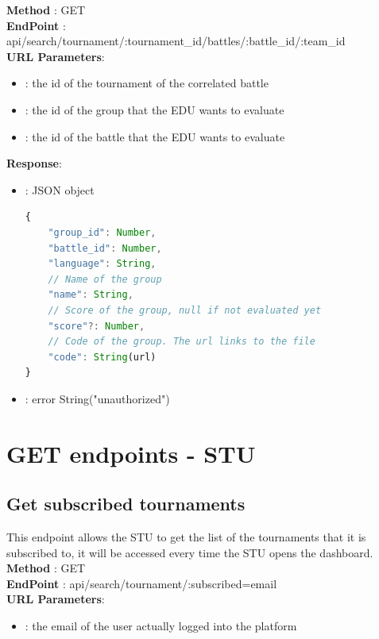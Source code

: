 \textbf{Method} : GET \\
\textbf{EndPoint} : api/search/tournament/:tournament\_id/battles/:battle\_id/:team\_id     \\
\textbf{URL Parameters}:
\begin{itemize}
    \item {} : the id of the tournament of the correlated battle
    \item {}: the id of the group that the EDU wants to evaluate
    \item {}: the id of the battle that the EDU wants to evaluate
\end{itemize}
\textbf{Response}:
\begin{itemize}
    \item {} : JSON object
          \begin{lstlisting}[language=JavaScript, label={lst:jscode}, basicstyle=\ttfamily]
{
    "group_id": Number,
    "battle_id": Number,
    "language": String,
    // Name of the group
    "name": String,
    // Score of the group, null if not evaluated yet
    "score"?: Number,
    // Code of the group. The url links to the file
    "code": String(url)
}
    \end{lstlisting}
    \item {} : error String("unauthorized")
\end{itemize}



\section*{GET endpoints - STU}

\subsection*{Get subscribed tournaments}
This endpoint allows the STU to get the list of the tournaments that it is subscribed to, it will be accessed every time the STU opens the dashboard.\\

\textbf{Method} : GET \\
\textbf{EndPoint} : api/search/tournament/:subscribed=email     \\
\textbf{URL Parameters}:
    \begin{itemize}
        \item {} : the email of the user actually logged into the platform
    \end{itemize}

